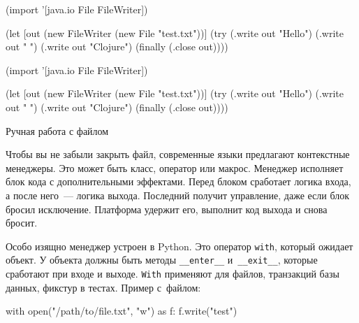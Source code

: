 \begin{listing}[ht!]

\ifx\DEVICETYPE\MOBILE

\begin{english}
  \begin{clojure}
(import '[java.io File FileWriter])

(let [out (new FileWriter
            (new File "test.txt"))]
  (try
    (.write out "Hello")
    (.write out " ")
    (.write out "Clojure")
    (finally
      (.close out))))
  \end{clojure}
\end{english}

\else

\begin{english}
  \begin{clojure}
(import '[java.io File FileWriter])

(let [out (new FileWriter (new File "test.txt"))]
  (try
    (.write out "Hello")
    (.write out " ")
    (.write out "Clojure")
    (finally
      (.close out))))
  \end{clojure}
\end{english}

\fi

\caption{Ручная работа с файлом}
\label{fig:write-file}

\end{listing}

Чтобы вы не забыли закрыть файл, современные языки предлагают контекстные
менеджеры. Это может быть класс, оператор или макрос. Менеджер исполняет блок
кода с дополнительными эффектами. Перед блоком сработает логика входа, а после
него~--- логика выхода. Последний получит управление, даже если блок бросил
исключение. Платформа удержит его, выполнит код выхода и снова бросит.


Особо изящно менеджер устроен в Python. Это оператор \verb|with|, который
ожидает объект. У объекта должны быть методы \verb|__enter__|
и~\verb|__exit__|, которые сработают при входе и выходе. \verb|With|
применяют для файлов, транзакций базы данных, фикстур в тестах. Пример с~файлом:


\begin{english}
  \begin{python}
with open("/path/to/file.txt", "w") as f:
    f.write("test")
  \end{python}
\end{english}

